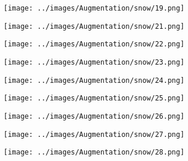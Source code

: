 \begin{figure}[H]
\begin{subfigure}[b]{0.1\textwidth}
\end{subfigure}
\hspace{1em}%
\begin{subfigure}[b]{0.1\textwidth}
 \centering
 \texttt{[image: ../images/Augmentation/snow/19.png]}
\end{subfigure}
\hspace{1em}%
\begin{subfigure}[b]{0.1\textwidth}
\centering
\texttt{[image: ../images/Augmentation/snow/21.png]}
\end{subfigure}
\hspace{1em}%
\begin{subfigure}[b]{0.1\textwidth}
 \centering
 \texttt{[image: ../images/Augmentation/snow/22.png]}
\end{subfigure}
\hspace{1em}%
\begin{subfigure}[b]{0.1\textwidth}
 \centering
 \texttt{[image: ../images/Augmentation/snow/23.png]}
\end{subfigure}
\hspace{1em}%
\begin{subfigure}[b]{0.1\textwidth}
 \centering
 \texttt{[image: ../images/Augmentation/snow/24.png]}
\end{subfigure}
\hspace{1em}%
\begin{subfigure}[b]{0.1\textwidth}
\centering
\texttt{[image: ../images/Augmentation/snow/25.png]}
\end{subfigure}
\hspace{1em}%
\begin{subfigure}[b]{0.1\textwidth}
 \centering
 \texttt{[image: ../images/Augmentation/snow/26.png]}
\end{subfigure}
\hspace{1em}%
\begin{subfigure}[b]{0.1\textwidth}
 \centering
 \texttt{[image: ../images/Augmentation/snow/27.png]}
\end{subfigure}
\hspace{1em}%
\begin{subfigure}[b]{0.1\textwidth}
 \centering
 \texttt{[image: ../images/Augmentation/snow/28.png]}
\end{subfigure}
\hspace{1em}%
\begin{subfigure}[b]{0.1\textwidth}

\end{subfigure}
\end{figure}
